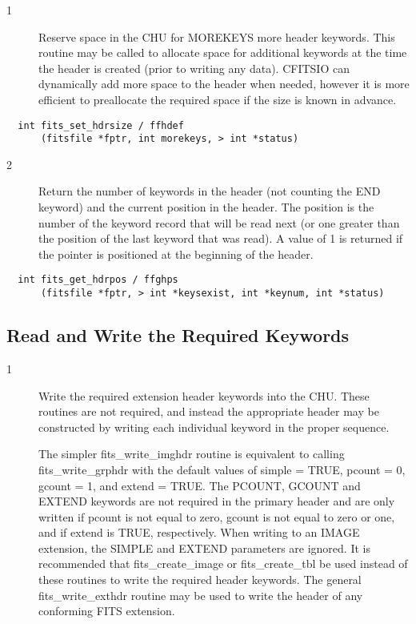 \documentclass[11pt]{book}
\begin{document}
\begin{description}
\item[1 ] Reserve space in the CHU for MOREKEYS more header keywords.
    This routine may be called to allocate space for additional keywords
    at the time the header is created (prior to writing any data).
    CFITSIO can dynamically add more space to the header when needed,
    however it is more efficient to preallocate the required space
   if the size is known in advance. \label{ffhdef}
\end{description}

\begin{verbatim}
  int fits_set_hdrsize / ffhdef
      (fitsfile *fptr, int morekeys, > int *status)
\end{verbatim}

\begin{description}
\item[2 ] Return the number of keywords in the header (not counting the END
    keyword) and the current position
    in the header.  The position is the number of the keyword record that
    will be read next (or one greater than the position of the last keyword
    that was read). A value of 1 is returned if the pointer is
   positioned at the beginning of the header. \label{ffghps}
\end{description}

\begin{verbatim}
  int fits_get_hdrpos / ffghps
      (fitsfile *fptr, > int *keysexist, int *keynum, int *status)
\end{verbatim}


\subsection{Read and Write the Required Keywords}


\begin{description}
\item[1 ] Write the required extension header keywords into the CHU.
  These routines are not required, and instead the appropriate
  header may be constructed by writing each individual keyword in the
  proper sequence.

  The simpler fits\_write\_imghdr routine is equivalent to calling
  fits\_write\_grphdr with the default values of simple = TRUE, pcount
  = 0, gcount = 1, and extend = TRUE.  The PCOUNT, GCOUNT and EXTEND
  keywords are not required in the primary header and are only written
  if pcount is not equal to zero, gcount is not equal to zero or one,
  and if extend is TRUE, respectively.  When writing to an IMAGE
  extension, the SIMPLE and EXTEND parameters are ignored.  It is
  recommended that fits\_create\_image or fits\_create\_tbl be used
  instead of these routines to write the
  required header keywords. The general fits\_write\_exthdr routine
  may be used to write the header of any conforming FITS
 extension.  \label{ffphpr} \label{ffphps}
\end{description}
\end{document}
